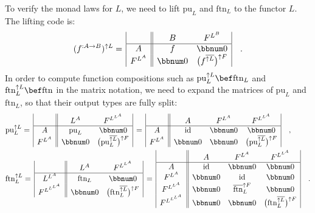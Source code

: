 To verify the monad laws for $L$, we need to lift $\text{pu}_{L}$
and $\text{ftn}_{L}$ to the functor $L$. The lifting code is:
\[
(f^{:A\rightarrow B})^{\uparrow L}=\,\begin{array}{|c||cc|}
 & B & F^{L^{B}}\\
\hline A & f & \bbnum 0\\
F^{L^{A}} & \bbnum 0 & \big(f^{\overline{\uparrow L}}\big)^{\uparrow F}
\end{array}\quad.
\]
In order to compute function compositions such as $\text{pu}_{L}^{\uparrow L}\bef\text{ftn}_{L}$
and $\text{ftn}_{L}^{\uparrow L}\bef\text{ftn}$ in the matrix notation,
we need to expand the matrices of $\text{pu}_{L}$ and $\text{ftn}_{L}$,
so that their output types are fully split:
\begin{align*}
 & \text{pu}_{L}^{\uparrow L}=\,\begin{array}{|c||cc|}
 & L^{A} & F^{L^{L^{A}}}\\
\hline A & \text{pu}_{L} & \bbnum 0\\
F^{L^{A}} & \bbnum 0 & \big(\text{pu}_{L}^{\overline{\uparrow L}}\big)^{\uparrow F}
\end{array}\,=\,\begin{array}{|c||ccc|}
 & A & F^{L^{A}} & F^{L^{L^{A}}}\\
\hline A & \text{id} & \bbnum 0 & \bbnum 0\\
F^{L^{A}} & \bbnum 0 & \bbnum 0 & \big(\text{pu}_{L}^{\overline{\uparrow L}}\big)^{\uparrow F}
\end{array}\quad,\\
 & \text{ftn}_{L}^{\uparrow L}=\,\begin{array}{|c||cc|}
 & L^{A} & F^{L^{L^{A}}}\\
\hline L^{L^{A}} & \text{ftn}_{L} & \bbnum 0\\
F^{L^{L^{L^{A}}}} & \bbnum 0 & \big(\text{ftn}_{L}^{\overline{\uparrow L}}\big)^{\uparrow F}
\end{array}\,=\,\begin{array}{|c||ccc|}
 & A & F^{L^{A}} & F^{L^{L^{A}}}\\
\hline A & \text{id} & \bbnum 0 & \bbnum 0\\
F^{L^{A}} & \bbnum 0 & \text{id} & \bbnum 0\\
F^{L^{L^{A}}} & \bbnum 0 & \overline{\text{ftn}}_{L}^{\uparrow F} & \bbnum 0\\
F^{L^{L^{L^{A}}}} & \bbnum 0 & \bbnum 0 & \big(\text{ftn}_{L}^{\overline{\uparrow L}}\big)^{\uparrow F}
\end{array}\quad.
\end{align*}
